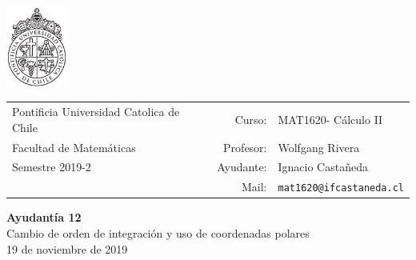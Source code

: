 \documentclass[12pt]{article}
\makeatletter
\newcommand{\ayudantia}{{\sc Ayudantía 12}}
\newcommand{\tituloayu}{Cambio de orden de integración y uso de coordenadas polares}
\newcommand{\fecha}{19 de noviembre de 2019}
\newcommand{\sigla}{MAT1620}
\newcommand{\nombre}{Cálculo II}
\newcommand{\profesor}{Wolfgang Rivera}
\newcommand{\ano}{2019}
\newcommand{\semestre}{2}
\newcommand{\mail}{mat1620@ifcastaneda.cl}
\makeatother
\begin{document}
\thispagestyle{empty}

\begin{minipage}{2cm}
	\includegraphics[width=2cm]{../../../../img/logo.pdf}
	\vspace{0.5cm}
\end{minipage}
\begin{minipage}{\linewidth}
	\begin{tabular}{lrl}
		{\scriptsize\sc Pontificia Universidad Catolica de Chile} & \hspace*{0.7in}Curso: &
		\sigla  - \nombre\\
		{\sc Facultad de Matemáticas}&
		Profesor: & \profesor \\
		{\sc Semestre \ano-\semestre} & Ayudante: & {Ignacio Castañeda}\\
		& {Mail:} & \texttt{\mail}
	\end{tabular}
\end{minipage}

\vspace{-10mm}
\begin{center}
	{\LARGE\bf \ayudantia}\\
	\vspace{0.1cm}
	{\tituloayu}\\
	\vspace{0.1cm}
	\fecha\\
	\vspace{0.4cm}
\end{center}
\end{document}
